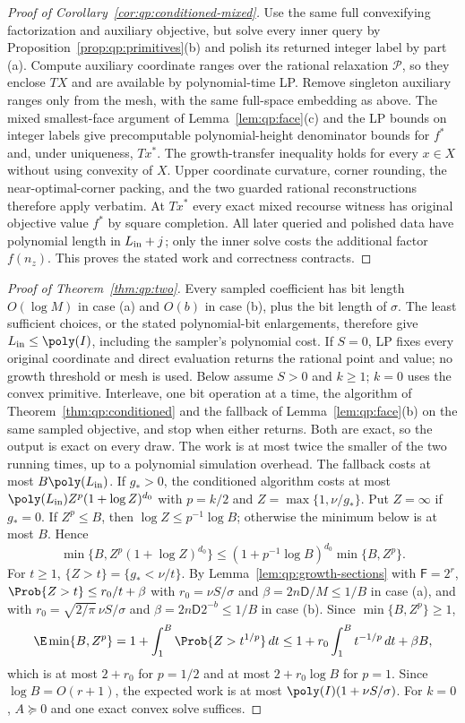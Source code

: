 \begin{proof}[Proof of Corollary~\ref{cor:qp:conditioned-mixed}]
Use the same full convexifying factorization and auxiliary objective, but
solve every inner query by Proposition~\ref{prop:qp:primitives}(b) and
polish its returned integer label by part (a). Compute auxiliary coordinate
ranges over the rational relaxation $\mathcal P$, so they enclose $TX$ and
are available by polynomial-time LP. Remove singleton auxiliary ranges
only from the mesh, with the same full-space embedding as above.
The mixed smallest-face argument of Lemma~\ref{lem:qp:face}(c) and the
LP bounds on integer labels give precomputable polynomial-height
denominator bounds for $f^*$ and, under uniqueness, $Tx^*$.
The growth-transfer inequality holds for every $x\in X$ without using
convexity of $X$. Upper coordinate curvature, corner rounding, the
near-optimal-corner packing, and the two guarded rational reconstructions
therefore apply verbatim. At $Tx^*$ every exact mixed recourse witness has
original objective value $f^*$ by square completion. All later queried and
polished data have polynomial length in $L_{\rm in}+j$; only the inner
solve costs the additional factor $f(n_z)$. This proves the stated work
and correctness contracts.
\end{proof}

\begin{proof}[Proof of Theorem~\ref{thm:qp:two}]
Every sampled coefficient has bit length $O(\log M)$ in case (a) and
$O(b)$ in case (b), plus the bit length of $\sigma$. The least sufficient
choices, or the stated polynomial-bit enlargements, therefore give
$L_{\rm in}\le\poly(I)$, including the sampler's polynomial cost.
If $S=0$, LP fixes every original coordinate and direct evaluation returns
the rational point and value; no growth threshold or mesh is used. Below
assume $S>0$ and $k\ge1$; $k=0$ uses the convex primitive.
Interleave, one bit operation at a time, the algorithm of
Theorem~\ref{thm:qp:conditioned} and the fallback of Lemma~\ref{lem:qp:face}(b)
on the same sampled objective, and stop when either returns. Both are exact,
so the output is exact on every draw. The work is at most twice the smaller
of the two running times, up to a polynomial simulation overhead. The
fallback costs at most $B\poly(L_{\rm in})$. If $g_*>0$, the conditioned
algorithm costs at most $\poly(L_{\rm in})Z^p(1+\log Z)^{d_0}$ with $p=k/2$ and
$Z=\max\{1,\nu/g_*\}$. Put $Z=\infty$ if $g_*=0$. If $Z^p\le B$, then
$\log Z\le p^{-1}\log B$; otherwise the minimum below is at most $B$. Hence
\[
 \min\{B,Z^p(1+\log Z)^{d_0}\}\le(1+p^{-1}\log B)^{d_0}\min\{B,Z^p\}.
\]
For $t\ge1$, $\{Z>t\}=\{g_*<\nu/t\}$. By Lemma~\ref{lem:qp:growth-sections}
with $\mathsf F=2^r$, $\Prob\{Z>t\}\le r_0/t+\beta$ with $r_0=\nu S/\sigma$ and
$\beta=2n\mathsf D/M\le1/B$ in case (a), and with $r_0=\sqrt{2/\pi}\,\nu S/\sigma$
and $\beta=2n\mathsf D2^{-b}\le1/B$ in case (b). Since $\min\{B,Z^p\}\ge1$,
\[
 \E\min\{B,Z^p\}=1+\int_1^B\Prob\{Z>t^{1/p}\}\,dt
 \le1+r_0\int_1^Bt^{-1/p}\,dt+\beta B,
\]
which is at most $2+r_0$ for $p=1/2$ and at most $2+r_0\log B$ for $p=1$.
Since $\log B=O(r+1)$, the expected work is at most
$\poly(I)(1+\nu S/\sigma)$. For $k=0$, $A\succeq0$ and one exact convex solve
suffices.
\end{proof}

